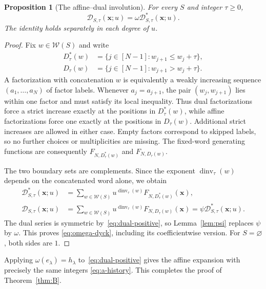 \documentclass[11pt,reqno]{amsart}
\newcommand{\xx}{\mathbf x}
\newcommand{\DD}{\mathcal D}
\newcommand{\WW}{\mathcal W}
\newcommand{\dinv}{\operatorname{dinv}}
\newtheorem{proposition}[theorem]{Proposition}
\theoremstyle{definition}
\theoremstyle{remark}
\numberwithin{equation}{section}
\begin{document}
\begin{proposition}[The affine--dual involution]\label{prop:omega}
For every $S$ and integer $\tau\geq0$,
\begin{equation}\label{eq:omega-dyck}
 \DD_{S,\tau}(\xx;u)=\omega\DD^*_{S,\tau}(\xx;u).
\end{equation}
The identity holds separately in each degree of $u$.
\end{proposition}
\begin{proof}
Fix $w\in\WW(S)$ and write
\begin{align*}
 D^*_\tau(w)&=\{j\in[N-1]:w_{j+1}\leq w_j+\tau\},\\
 D_\tau(w)&=\{j\in[N-1]:w_{j+1}>w_j+\tau\}.
\end{align*}
A factorization with concatenation $w$ is equivalently a weakly
increasing sequence $(a_1,\ldots,a_N)$ of factor labels.  Whenever
$a_j=a_{j+1}$, the pair $(w_j,w_{j+1})$ lies within one factor and
must satisfy its local inequality.  Thus dual factorizations force
a strict increase exactly at the positions in $D^*_\tau(w)$, while
affine factorizations force one exactly at the positions in
$D_\tau(w)$.  Additional strict increases are allowed in either case.
Empty factors correspond to skipped labels, so no further choices
or multiplicities are missing.  The fixed-word generating functions
are consequently $F_{N,D^*_\tau(w)}$ and $F_{N,D_\tau(w)}$.

The two boundary sets are complements.  Since the exponent
$\dinv_\tau(w)$ depends on the concatenated word alone, we obtain
\begin{align*}
 \DD^*_{S,\tau}(\xx;u)
   &=\sum_{w\in\WW(S)}u^{\dinv_\tau(w)}F_{N,D^*_\tau(w)}(\xx),\\
 \DD_{S,\tau}(\xx;u)
   &=\sum_{w\in\WW(S)}u^{\dinv_\tau(w)}F_{N,D_\tau(w)}(\xx)
     =\psi\DD^*_{S,\tau}(\xx;u).
\end{align*}
The dual series is symmetric by~\eqref{eq:dual-positive}, so
Lemma~\ref{lem:psi} replaces $\psi$ by $\omega$.  This proves
\eqref{eq:omega-dyck}, including its coefficientwise version.
For $S=\varnothing$, both sides are $1$.
\end{proof}

Applying $\omega(e_\lambda)=h_\lambda$ to~\eqref{eq:dual-positive}
gives the affine expansion with precisely the same integers
\eqref{eq:a-history}.  This completes the proof of
Theorem~\ref{thm:B}.
\end{document}
